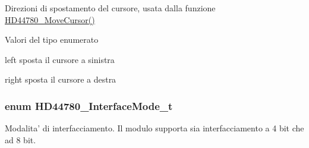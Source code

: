 Direzioni di spostamento del cursore, usata dalla funzione \hyperlink{group___h_d44780_gabcea9a03050c46530e39b7556c673baf}{H\+D44780\+\_\+\+Move\+Cursor()} 

\begin{Desc}
\item[Valori del tipo enumerato]\par
\begin{description}
\item[{\em 
\hypertarget{group___h_d44780_ggaf46f4db4f981d3a1088804a6d6980d30aa4d704398d4edd1e0dec8dbb55f90292}{H\+D44780\+\_\+\+Cursor\+Left}\label{group___h_d44780_ggaf46f4db4f981d3a1088804a6d6980d30aa4d704398d4edd1e0dec8dbb55f90292}
}]left sposta il cursore a sinistra \item[{\em 
\hypertarget{group___h_d44780_ggaf46f4db4f981d3a1088804a6d6980d30a26006ced693b6bab28c6e30bfdb8c399}{H\+D44780\+\_\+\+Cursor\+Right}\label{group___h_d44780_ggaf46f4db4f981d3a1088804a6d6980d30a26006ced693b6bab28c6e30bfdb8c399}
}]right sposta il cursore a destra \end{description}
\end{Desc}
\hypertarget{group___h_d44780_gaaaea8b73e24f7658da4118f6b01b45f0}{
\subsubsection[{H\+D44780\+\_\+\+Interface\+Mode\+\_\+t}]{\setlength{\rightskip}{0pt plus 5cm}enum {\bf H\+D44780\+\_\+\+Interface\+Mode\+\_\+t}}}\label{group___h_d44780_gaaaea8b73e24f7658da4118f6b01b45f0}


Modalita' di interfacciamento. Il modulo supporta sia interfacciamento a 4 bit che ad 8 bit. 

